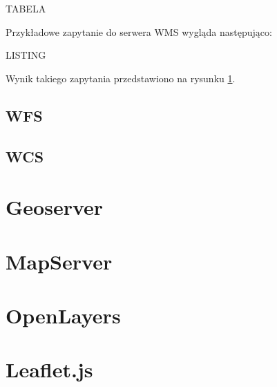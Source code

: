 TABELA

Przykładowe zapytanie do serwera WMS wygląda następująco: 

LISTING

Wynik takiego zapytania przedstawiono na rysunku \ref{fig:pomorze_gdanskie}.

\begin{figure}[h!]
\label{fig:pomorze_gdanskie}
\end{figure}

\subsection{WFS}

\subsection{WCS}

\section{Geoserver}

\section{MapServer}

\section{OpenLayers}

\section{Leaflet.js}
